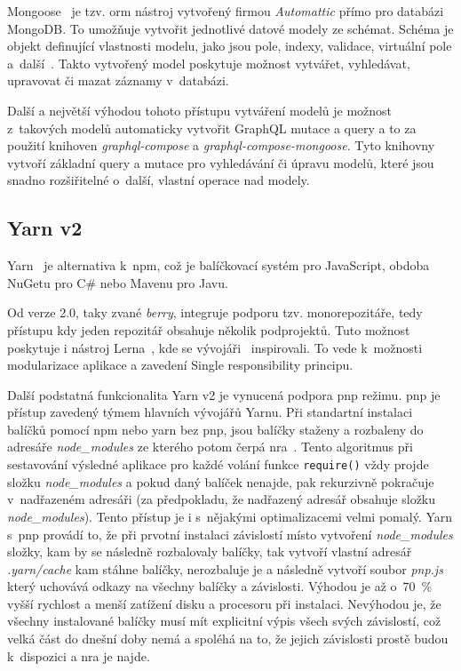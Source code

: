 Mongoose~\cite{automatticinc_2011_mongoose} je tzv. \acrfull{orm} nástroj vytvořený firmou \emph{Automattic} přímo pro databázi MongoDB. To umožňuje vytvořit jednotlivé datové modely ze schémat. Schéma je objekt definující vlastnosti modelu, jako jsou pole, indexy, validace, virtuální pole a~další~\cite{automatticinc_2020_mongoose}. Takto vytvořený model poskytuje možnost vytvářet, vyhledávat, upravovat či mazat záznamy v~databázi.

Další a největší výhodou tohoto přístupu vytváření modelů je možnost z~takových modelů automaticky vytvořit GraphQL mutace a query a to za použití knihoven \emph{graphql-compose} a \emph{graphql-compose-mongoose}. Tyto knihovny vytvoří základní query a mutace pro vyhledávání či úpravu modelů, které jsou snadno rozšiřitelné o~další, vlastní operace nad modely.

\subsection{Yarn v2}
\label{ss:yarn}
Yarn~\cite{facebookinc_2019_yarn} je alternativa k~\acrshort{npm}, což je balíčkovací systém pro JavaScript, obdoba NuGetu pro C\# nebo Mavenu pro Javu.

Od verze 2.0, taky zvané \emph{berry}, integruje podporu tzv. monorepozitáře, tedy přístupu kdy jeden repozitář obsahuje několik podprojektů. Tuto možnost poskytuje i nástroj Lerna~\cite{lernacontributors_2015_lerna}, kde se vývojáři~ inspirovali. To vede k~možnosti modularizace aplikace a zavedení Single responsibility principu.

Další podstatná funkcionalita Yarn v2 je vynucená podpora \acrfull{pnp} režimu. \acrshort{pnp} je přístup zavedený týmem hlavních vývojářů Yarnu. Při standartní instalaci balíčků pomocí npm nebo yarn bez pnp, jsou balíčky staženy a rozbaleny do adresáře \emph{node\_modules} ze kterého potom čerpá \acrfull{nra}~\cite{joyentinc_1_noderesolutionalgorithm}. Tento algoritmus při sestavování výsledné aplikace pro každé volání funkce \texttt{require()} vždy projde složku \emph{node\_modules} a pokud daný balíček nenajde, pak rekurzivně pokračuje v~nadřazeném adresáři (za předpokladu, že nadřazený adresář obsahuje složku \emph{node\_modules}). Tento přístup je i s~nějakými optimalizacemi velmi pomalý. Yarn s~\acrshort{pnp} provádí to, že při prvotní instalaci závislostí místo vytvoření \emph{node\_modules} složky, kam by se následně rozbalovaly balíčky, tak vytvoří vlastní adresář \emph{.yarn/cache} kam stáhne balíčky, nerozbaluje je a následně vytvoří soubor \emph{pnp.js} který uchovává odkazy na všechny balíčky a závislosti. Výhodou je až o~70~\% vyšší rychlost a menší zatížení disku a procesoru při instalaci. Nevýhodou je, že všechny instalované balíčky musí mít explicitní výpis všech svých závislostí, což velká část do dnešní doby nemá a spoléhá na to, že jejich závislosti prostě budou k~dispozici a \acrshort{nra} je najde.

